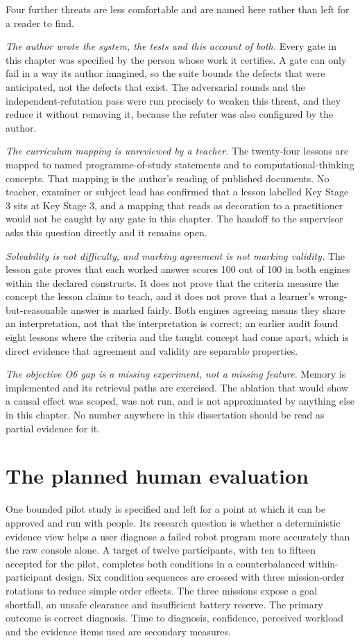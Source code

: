 \documentclass[11pt,a4paper]{report}
\begin{document}
Four further threats are less comfortable and are named here rather than left for a reader to find.

\emph{The author wrote the system, the tests and this account of both.} Every gate in this chapter was specified by the person whose work it certifies. A gate can only fail in a way its author imagined, so the suite bounds the defects that were anticipated, not the defects that exist. The adversarial rounds and the independent-refutation pass were run precisely to weaken this threat, and they reduce it without removing it, because the refuter was also configured by the author.

\emph{The curriculum mapping is unreviewed by a teacher.} The twenty-four lessons are mapped to named programme-of-study statements and to computational-thinking concepts. That mapping is the author's reading of published documents. No teacher, examiner or subject lead has confirmed that a lesson labelled Key Stage 3 sits at Key Stage 3, and a mapping that reads as decoration to a practitioner would not be caught by any gate in this chapter. The handoff to the supervisor asks this question directly and it remains open.

\emph{Solvability is not difficulty, and marking agreement is not marking validity.} The lesson gate proves that each worked answer scores 100 out of 100 in both engines within the declared constructs. It does not prove that the criteria measure the concept the lesson claims to teach, and it does not prove that a learner's wrong-but-reasonable answer is marked fairly. Both engines agreeing means they share an interpretation, not that the interpretation is correct; an earlier audit found eight lessons where the criteria and the taught concept had come apart, which is direct evidence that agreement and validity are separable properties.

\emph{The objective O6 gap is a missing experiment, not a missing feature.} Memory is implemented and its retrieval paths are exercised. The ablation that would show a causal effect was scoped, was not run, and is not approximated by anything else in this chapter. No number anywhere in this dissertation should be read as partial evidence for it.

\section{The planned human evaluation}
One bounded pilot study is specified and left for a point at which it can be approved and run with people. Its research question is whether a deterministic evidence view helps a user diagnose a failed robot program more accurately than the raw console alone. A target of twelve participants, with ten to fifteen accepted for the pilot, completes both conditions in a counterbalanced within-participant design. Six condition sequences are crossed with three mission-order rotations to reduce simple order effects. The three missions expose a goal shortfall, an unsafe clearance and insufficient battery reserve. The primary outcome is correct diagnosis. Time to diagnosis, confidence, perceived workload and the evidence items used are secondary measures.
\end{document}
